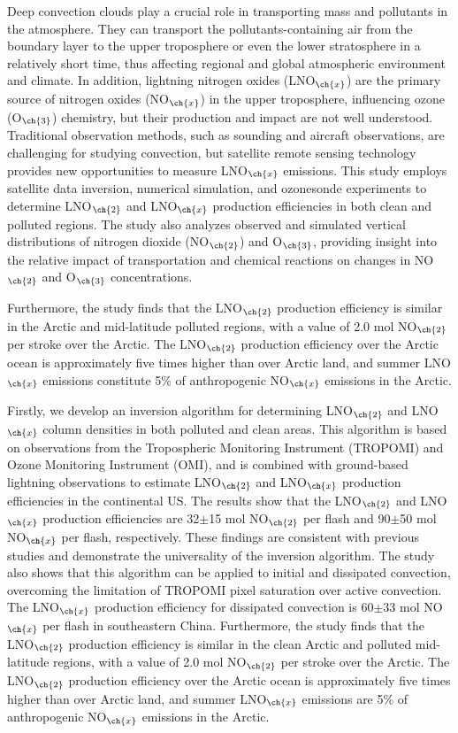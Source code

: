 {
Deep convection clouds play a crucial role in transporting mass and pollutants in the atmosphere.
They can transport the pollutants-containing air from the boundary layer to the upper troposphere or even the lower stratosphere in a relatively short time, thus affecting regional and global atmospheric environment and climate.
In addition, lightning nitrogen oxides (LNO$_{\ch{x}}$) are the primary source of nitrogen oxides (NO$_{\ch{x}}$) in the upper troposphere, influencing ozone (O$_{\ch{3}}$) chemistry, but their production and impact are not well understood.
Traditional observation methods, such as sounding and aircraft observations, are challenging for studying convection,
but satellite remote sensing technology provides new opportunities to measure LNO$_{\ch{x}}$ emissions.
This study employs satellite data inversion, numerical simulation, and ozonesonde experiments to determine LNO$_{\ch{2}}$ and LNO$_{\ch{x}}$ production efficiencies in both clean and polluted regions.
The study also analyzes observed and simulated vertical distributions of nitrogen dioxide (NO$_{\ch{2}}$) and O$_{\ch{3}}$, providing insight into the relative impact of transportation and chemical reactions on changes in NO$_{\ch{2}}$ and O$_{\ch{3}}$ concentrations.



Furthermore, the study finds that the LNO$_{\ch{2}}$ production efficiency is similar in the Arctic and mid-latitude polluted regions, with a value of 2.0 mol NO$_{\ch{2}}$ per stroke over the Arctic. The LNO$_{\ch{2}}$ production efficiency over the Arctic ocean is approximately five times higher than over Arctic land, and summer LNO$_{\ch{x}}$ emissions constitute 5\% of anthropogenic NO$_{\ch{x}}$ emissions in the Arctic.


Firstly, we develop an inversion algorithm for determining LNO$_{\ch{2}}$ and LNO$_{\ch{x}}$ column densities in both polluted and clean areas.
This algorithm is based on observations from the Tropospheric Monitoring Instrument (TROPOMI) and Ozone Monitoring Instrument (OMI), and is combined with ground-based lightning observations to estimate LNO$_{\ch{2}}$ and LNO$_{\ch{x}}$ production efficiencies in the continental US.
The results show that the LNO$_{\ch{2}}$ and LNO$_{\ch{x}}$ production efficiencies are 32$\pm$15 mol NO$_{\ch{2}}$ per flash and 90$\pm$50 mol NO$_{\ch{x}}$ per flash, respectively.
These findings are consistent with previous studies and demonstrate the universality of the inversion algorithm.
The study also shows that this algorithm can be applied to initial and dissipated convection, overcoming the limitation of TROPOMI pixel saturation over active convection.
The LNO$_{\ch{x}}$ production efficiency for dissipated convection is 60$\pm$33 mol NO$_{\ch{x}}$ per flash in southeastern China.
Furthermore, the study finds that the LNO$_{\ch{2}}$ production efficiency is similar in the clean Arctic and polluted mid-latitude  regions, with a value of 2.0 mol NO$_{\ch{2}}$ per stroke over the Arctic.
The LNO$_{\ch{2}}$ production efficiency over the Arctic ocean is approximately five times higher than over Arctic land, and summer LNO$_{\ch{x}}$ emissions are 5\% of anthropogenic NO$_{\ch{x}}$ emissions in the Arctic.

}
